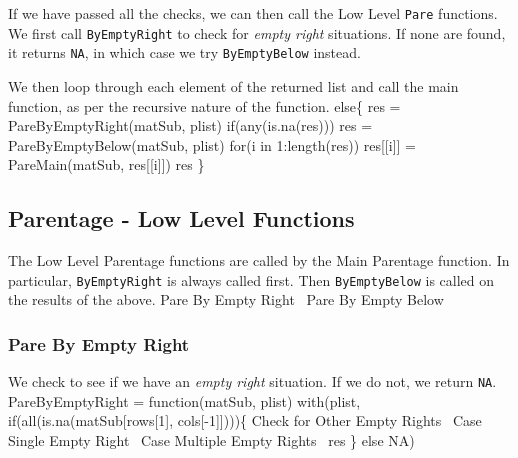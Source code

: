 \documentclass[a4paper]{article}
\begin{document}
If we have passed all the checks, we can then call the Low Level
\verb|Pare| functions. We first call \verb|ByEmptyRight| to check for
\emph{empty right} situations. If none are found, it returns
\verb|NA|, in which case we try \verb|ByEmptyBelow| instead.

We then loop through each element of the returned list and call the
main function, as per the recursive nature of the function.
\nwenddocs{}\endmoddef
else\{
  res = PareByEmptyRight(matSub, plist)
  if(any(is.na(res)))
    res = PareByEmptyBelow(matSub, plist)
  for(i in 1:length(res))
    res[[i]] = PareMain(matSub, res[[i]])
  res
\}
\nwendcode{}\nwdocspar

\subsection{Parentage - Low Level Functions}
\label{sec:PareLowLevel}
The Low Level Parentage functions are called by the Main Parentage
function. In particular, \verb|ByEmptyRight| is always called
first. Then \verb|ByEmptyBelow| is called on the results of the above.
\nwenddocs{}\endmoddef
\LA{}Pare By Empty Right~{\nwtagstyle{}}\RA{}
\LA{}Pare By Empty Below~{\nwtagstyle{}}\RA{}
\nwendcode{}\nwdocspar

\subsubsection{Pare By Empty Right}
We check to see if we have an \emph{empty right} situation. If we do
not, we return \verb|NA|.
\nwenddocs{}\endmoddef
PareByEmptyRight =
  function(matSub, plist)
  with(plist,
       if(all(is.na(matSub[rows[1], cols[-1]])))\{
         \LA{}Check for Other Empty Rights~{\nwtagstyle{}}\RA{}
         \LA{}Case Single Empty Right~{\nwtagstyle{}}\RA{}
         \LA{}Case Multiple Empty Rights~{\nwtagstyle{}}\RA{}
         res
       \} else NA)
\eatline
{}\nwendcode{}\nwdocspar
\end{document}
